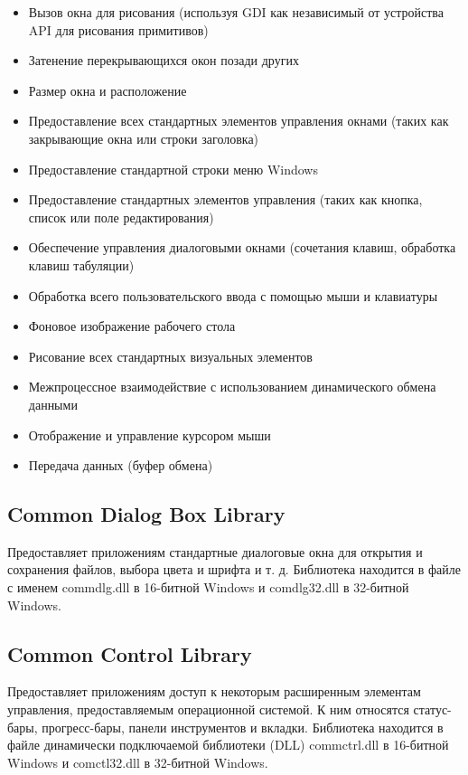     \begin{itemize}
        \item Вызов окна для рисования (используя GDI как независимый от устройства API для рисования примитивов)
        \item Затенение перекрывающихся окон позади других
        \item Размер окна и расположение
        \item Предоставление всех стандартных элементов управления окнами (таких как закрывающие окна или строки заголовка)
        \item Предоставление стандартной строки меню Windows
        \item Предоставление стандартных элементов управления (таких как кнопка, список или поле редактирования)
        \item Обеспечение управления диалоговыми окнами (сочетания клавиш, обработка клавиш табуляции)
        \item Обработка всего пользовательского ввода с помощью мыши и клавиатуры
        \item Фоновое изображение рабочего стола
        \item Рисование всех стандартных визуальных элементов
        \item Межпроцессное взаимодействие с использованием динамического обмена данными
        \item Отображение и управление курсором мыши
        \item Передача данных (буфер обмена)
    \end{itemize}

    \subsection{Common Dialog Box Library}
    Предоставляет приложениям стандартные диалоговые окна для открытия и сохранения файлов, выбора цвета и шрифта и т. д.
    Библиотека находится в файле с именем commdlg.dll в 16-битной Windows и comdlg32.dll в 32-битной Windows.

    \subsection{Common Control Library}
    Предоставляет приложениям доступ к некоторым расширенным элементам управления, предоставляемым операционной системой.
    К ним относятся статус-бары, прогресс-бары, панели инструментов и вкладки.
    Библиотека находится в файле динамически подключаемой библиотеки (DLL) commctrl.dll в 16-битной Windows и comctl32.dll в 32-битной Windows.

